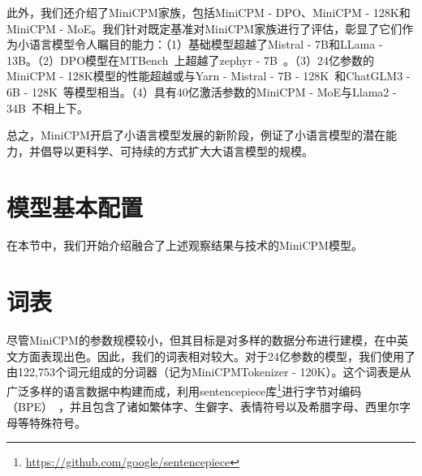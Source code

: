 此外，我们还介绍了MiniCPM家族，包括MiniCPM - DPO、MiniCPM - 128K和MiniCPM - MoE。我们针对既定基准对MiniCPM家族进行了评估，彰显了它们作为小语言模型令人瞩目的能力：（1）基础模型超越了Mistral - 7B和LLama - 13B。（2）DPO模型在MTBench~\citep{zheng2024judging}上超越了zephyr - 7B~\citep{tunstall2023zephyr}。（3）24亿参数的MiniCPM - 128K模型的性能超越或与Yarn - Mistral - 7B - 128K~\citep{peng2023yarn}和ChatGLM3 - 6B - 128K~\citep{du2021glm}等模型相当。（4）具有40亿激活参数的MiniCPM - MoE与Llama2 - 34B~\citep{touvron2023llama}不相上下。

总之，MiniCPM开启了小语言模型发展的新阶段，例证了小语言模型的潜在能力，并倡导以更科学、可持续的方式扩大大语言模型的规模。 



\section{模型基本配置}
在本节中，我们开始介绍融合了上述观察结果与技术的MiniCPM模型。
\label{sec:model}
\begin{table}[htbp]
    \centering
{}
    \caption{MiniCPM的模型配置。N（十亿）、$d_m$、$d_{ff}$、$d_h$、$n_q$、$n_{kv}$、$L$、批量大小（百万）、词元数（T）分别代表模型的非嵌入参数数量、模型隐藏维度、前馈层瓶颈维度、注意力头维度、查询数量、键/值数量、层数、训练批量大小、总训练词元数。}
    \label{tab:model_configs}
\end{table}

\section{词表}
尽管MiniCPM的参数规模较小，但其目标是对多样的数据分布进行建模，在中英文方面表现出色。因此，我们的词表相对较大。对于24亿参数的模型，我们使用了由122,753个词元组成的分词器（记为MiniCPMTokenizer - 120K）。这个词表是从广泛多样的语言数据中构建而成，利用sentencepiece库\footnote{\url{https://github.com/google/sentencepiece}}进行字节对编码（BPE）~\citep{sennrich-etal-2016-neural}，并且包含了诸如繁体字、生僻字、表情符号以及希腊字母、西里尔字母等特殊符号。

